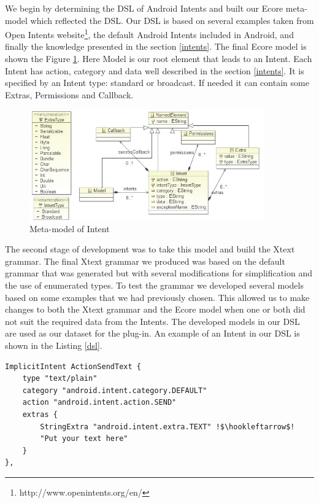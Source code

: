 We begin by determining the DSL of Android Intents and built our Ecore meta-model which reflected the DSL. Our DSL is based on several examples taken from Open Intents website\footnote{http://www.openintents.org/en/}, the default Android Intents included in Android, and finally the knowledge presented in the section \ref{intents}. The final Ecore model is shown the Figure \ref{meta-model}. Here Model is our root element that leads to an Intent. Each Intent has action, category and data well described in the section \ref{intents}. It is specified by an Intent type: standard or broadcast. If needed it can contain some Extras, Permissions and Callback.

\begin{figure}[t]
\label{meta-model}
  \centering
    \includegraphics[width=0.9\textwidth]{metamodel}
  \caption{Meta-model of Intent}
\end{figure}

The second stage of development was to take this model and build the Xtext grammar. The final Xtext grammar we produced was based on the default grammar that was generated but with several modifications for simplification and the use of enumerated types. To test the grammar we developed several models based on some examples that we had previously chosen. This allowed us to make changes to both the Xtext grammar and the Ecore model when one or both did not suit the required data from the Intents. The developed models in our DSL are used as our dataset for the plug-in. An example of an Intent in our DSL is shown in the Listing \ref{dsl}.

{\footnotesize\begin{lstlisting}[escapechar=!,label=dsl,caption=Intent in DSL]
ImplicitIntent ActionSendText {
	type "text/plain"
	category "android.intent.category.DEFAULT"
	action "android.intent.action.SEND"
	extras {
		StringExtra "android.intent.extra.TEXT" !$\hookleftarrow$!
		"Put your text here"
	}
},
\end{lstlisting}}

